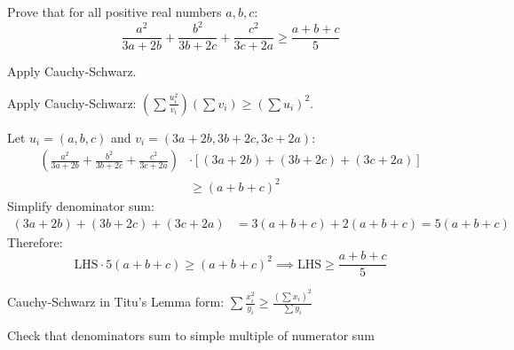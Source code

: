 \begin{problem}
Prove that for all positive real numbers $a, b, c$:
\[ \frac{a^2}{3a+2b} + \frac{b^2}{3b+2c} + \frac{c^2}{3c+2a} \ge \frac{a+b+c}{5} \]
\end{problem}

\begin{hint}
Apply Cauchy-Schwarz.
\end{hint}

\begin{solution}
Apply Cauchy-Schwarz: $\left(\sum \frac{u_i^2}{v_i}\right)\left(\sum v_i\right) \ge \left(\sum u_i\right)^2$.

Let $u_i = (a, b, c)$ and $v_i = (3a+2b, 3b+2c, 3c+2a)$:
\begin{align*}
\left(\frac{a^2}{3a+2b} + \frac{b^2}{3b+2c} + \frac{c^2}{3c+2a}\right) &\cdot [(3a+2b) + (3b+2c) + (3c+2a)]\\
&\ge (a+b+c)^2
\end{align*}
Simplify denominator sum:
\begin{align*}
(3a+2b) + (3b+2c) + (3c+2a) &= 3(a+b+c) + 2(a+b+c) = 5(a+b+c)
\end{align*}
Therefore:
\[ \text{LHS} \cdot 5(a+b+c) \ge (a+b+c)^2 \implies \text{LHS} \ge \frac{a+b+c}{5} \]
\end{solution}

\begin{takeaways}
\item Cauchy-Schwarz in Titu's Lemma form: $\sum \frac{x_i^2}{y_i} \ge \frac{(\sum x_i)^2}{\sum y_i}$
\item Check that denominators sum to simple multiple of numerator sum
\end{takeaways}
